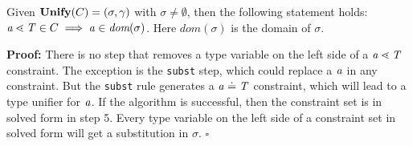 \begin{lemma}[Exhaustiveness]\label{lemma:unify-exhaustive}
  Given $\textbf{Unify}{}(C) = (\sigma, \gamma{})$ with $\sigma \neq \emptyset$,
  then the following statement holds:
  $\mathit{ a } \lessdot \mathit{T} \in C \implies \mathit{ a } \in \textit{dom}(\sigma)$.
  Here $\textit{dom}(\sigma)$ is the domain of $\sigma$.
\end{lemma} %
\textbf{Proof:}
There is no step that removes a type variable on the left side of a $\mathit{ a } \lessdot \mathit{T}$ constraint.
The exception is the \texttt{subst} step, which could replace a $\mathit{ a }$ in any constraint.
But the \texttt{subst} rule generates a $\mathit{ a } \doteq \mathit{T}$ constraint, which will lead to a type unifier for $\mathit{ a }$.
If the \unify{} algorithm is successful, then the constraint set is in solved form in step 5.
Every type variable on the left side of a constraint set in solved form will get a substitution in $\sigma$.
\hfill $\square$
\fi


